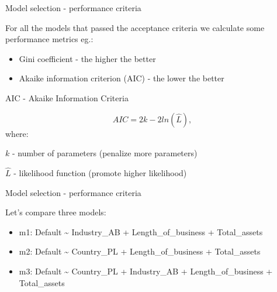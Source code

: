 \documentclass[9pt,ignorenonframetext,]{beamer}
\providecommand{\tightlist}{%
  \setlength{\itemsep}{0pt}\setlength{\parskip}{0pt}}
\begin{document}
\begin{frame}{Model selection - performance criteria}

For all the models that passed the acceptance criteria we calculate some
performance metrics eg.:

\begin{itemize}
\tightlist
\item
  Gini coefficient - the higher the better
\item
  Akaike information criterion (AIC) - the lower the better
\end{itemize}

\end{frame}

\begin{frame}{AIC - Akaike Information Criteria}

\[ AIC = 2k - 2ln(\hat{L}),\] where:

\(k\) - number of parameters (penalize more parameters)

\(\hat{L}\) - likelihood function (promote higher likelihood)

\end{frame}

\begin{frame}{Model selection - performance criteria}

Let's compare three models:

\begin{itemize}
\tightlist
\item
  m1: Default \textasciitilde{} Industry\_AB + Length\_of\_business +
  Total\_assets
\item
  m2: Default \textasciitilde{} Country\_PL + Length\_of\_business +
  Total\_assets
\item
  m3: Default \textasciitilde{} Country\_PL + Industry\_AB +
  Length\_of\_business + Total\_assets
\end{itemize}

\end{frame}
\end{document}
